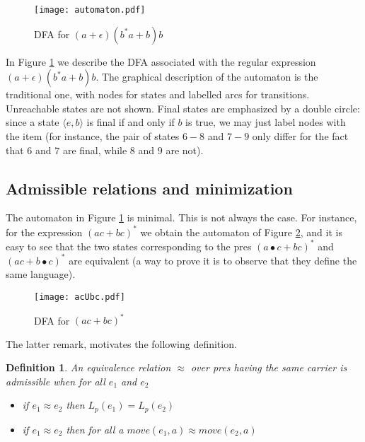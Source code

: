 \documentclass[preprint]{sigplanconf}
\newcounter{item}
\newtheorem{definition}[item]{Definition}
\begin{document}
\begin{figure}[htp]
\begin{center}
\texttt{[image: automaton.pdf]}
\caption{DFA for $(a+\epsilon)(b^*a + b)b$\label{automaton}}
\end{center}
\end{figure}

In Figure \ref{automaton} we describe the DFA
associated with the regular expression $(a+\epsilon)(b^*a + b)b$.
The graphical description of the automaton is the traditional one,
with nodes for states and labelled arcs for transitions. 
Unreachable states are not shown.
Final states are emphasized by a double circle: since a state
$\langle e,b \rangle$ is final if and only if $b$ is true, we
may just label nodes with the item (for instance, the pair of
states $6-8$ and $7-9$ only differ for the fact that $6$ and $7$ 
are final, while $8$ and $9$ are not).  



\subsection{Admissible relations and minimization}
The automaton in Figure \ref{automaton} is minimal. This is
not always the case. For instance, for the expression 
$(ac+bc)^*$ we obtain the automaton of Figure \ref{acUbc}, and 
it is easy to see that the two states corresponding to the
pres $(a\bullet c +bc)^*$ and $(ac+b\bullet c)^*$ are equivalent
(a way to prove it is to observe that they define the same
language). 

\begin{figure}[tp]
\begin{center}
\texttt{[image: acUbc.pdf]}
\caption{DFA for $(ac+bc)^*$\label{acUbc}}
\end{center}
\end{figure}



\noindent
The latter remark, motivates the following definition.

\begin{definition}
An equivalence relation $\approx$ over pres having the same carrier is admissible when for all $e_1$ and $e_2$
\begin{itemize}
\item if $e_1 \approx e_2$ then $L_p(e_1) = L_p(e_2)$
\item if $e_1 \approx e_2$ then for all a $move(e_1,a) \approx move(e_2,a)$
\end{itemize}
\end{definition}
\end{document}
